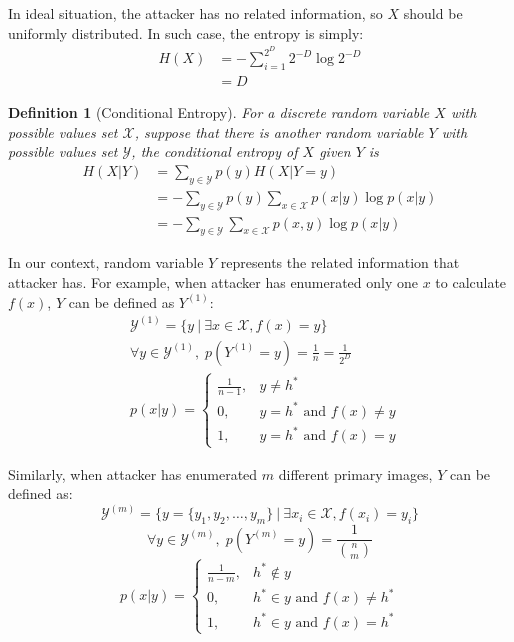 \documentclass[10pt,a4paper]{article}
\newtheorem{mydef}{Definition}
\begin{document}
		In ideal situation, the attacker has no related information, so $X$ should
		be uniformly distributed. In such case, the entropy is simply:
		\begin{align*}
			H(X) &= -\sum_{i=1}^{2^D} 2^{-D} \log 2^{-D}\\
				&= D
		\end{align*}
		
		\begin{mydef}[Conditional Entropy]
			For a discrete random variable $X$ with
			possible values set $\mathcal X$,
			suppose that there is another random
			variable $Y$ with possible values
			set $\mathcal{Y}$, the conditional entropy
			of $X$ given $Y$ is
			\begin{align}
				H(X|Y) &= \sum_{y \in \mathcal Y} p(y) H(X | Y = y)\\
					&= -\sum_{y \in \mathcal Y} p(y) \sum_{x \in \mathcal X} p(x|y) \log p(x|y)\\
					&= -\sum_{y \in \mathcal Y} \sum_{x \in \mathcal X} p(x, y) \log p(x|y)
			\end{align}
		\end{mydef}
		
		In our context, random variable $Y$ represents the related information
		that attacker has. For example, when attacker has enumerated only one
		$x$ to calculate $f(x)$, $Y$ can be defined as $Y^{(1)}$:
		\begin{align*}
			&\mathcal Y^{(1)} = \{y \: | \: \exists x \in \mathcal X, f(x) = y\}\\
			&\forall y \in \mathcal Y^{(1)}, \; p(Y^{(1)} = y) = \frac{1}{n} = \frac{1}{2^D}\\
			&p(x|y) = \begin{cases}
				\frac{1}{n-1}, &y \neq h^*\\
				0, &y = h^* \text{ and } f(x) \neq y\\
				1, &y = h^* \text{ and } f(x) = y
			\end{cases}
		\end{align*}
		
		Similarly, when attacker has enumerated $m$ different primary images, $Y$ can be defined
		as:
		\begin{equation*}
			\mathcal Y^{(m)} = \{ y = \{y_1, y_2, \ldots, y_m\} \: | \: \exists x_i \in \mathcal X, f(x_i) = y_i\}
		\end{equation*}
		\begin{equation*}
			\forall y \in \mathcal Y^{(m)}, \; p(Y^{(m)} = y) = \frac{1}{\binom{n}{m}}
		\end{equation*}
		\begin{equation*}
			p(x|y) = \begin{cases}
				\frac{1}{n-m}, &h^* \notin y\\
				0, &h^* \in y \text{ and } f(x) \neq h^*\\
				1, &h^* \in y \text{ and } f(x) = h^*
			\end{cases}
		\end{equation*}
		
\end{document}
